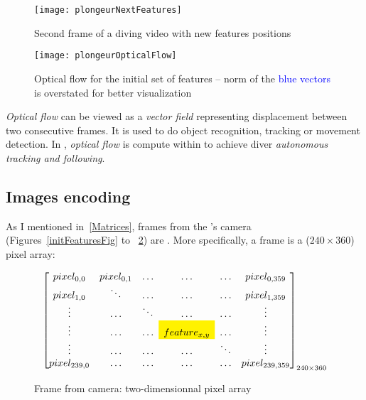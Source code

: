 \begin{figure}[!htbp]
	\centering
	\texttt{[image: plongeurNextFeatures]}
	\caption{Second frame of a diving video with new features positions}
	\label{secondFeaturesFig}
\end{figure}
\FloatBarrier



\begin{figure}[!htbp]
	\centering
	\texttt{[image: plongeurOpticalFlow]}
	\caption{Optical flow for the initial set of features -- \small{norm of the \textcolor{blue}{blue vectors} is overstated for better visualization}}
	\label{opticalFlowFig}
\end{figure}
\FloatBarrier

\emph{Optical flow} can be viewed as a \emph{vector field} representing  displacement between two consecutive frames. It is used to do object recognition, tracking or movement detection. In \iBubble, \emph{optical flow} is compute within  to achieve diver \emph{autonomous tracking and following}.\par


\subsection{Images encoding}

As I mentioned in~\ref{Matrices}, frames from the \rasp's camera (Figures~\ref{initFeaturesFig} to ~\ref{opticalFlowFig}) are . More specifically, a frame is a ($240\times 360$) pixel array:

\begin{figure}[!htbp]
\[
\begin{bmatrix}

pixel_{0,0} & pixel_{0,1} & \ldots & \ldots & \ldots & pixel_{0,359}\\

pixel_{1,0} & \ddots & \ldots & \ldots & \ldots & pixel_{1,359}\\

\vdots & \ldots & \ddots & \ldots & \ldots & \vdots\\

\vdots & \ldots & \ldots & \cellcolor{yellow}{feature_{x,y}} & \ldots & \vdots\\

\vdots & \ldots & \ldots & \ldots & \ddots & \vdots\\

pixel_{239,0} & \ldots & \ldots  & \ldots & \ldots & pixel_{239,359}

\end{bmatrix}_{240\times 360}
\]
\caption{Frame from camera: two-dimensionnal pixel array}
\label{frameFig}
\end{figure}
\FloatBarrier


